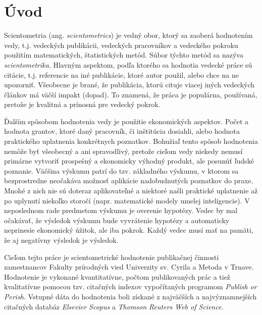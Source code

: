 \chapter*{Úvod}

Scientometria (ang. {\em scientometrics}) je vedný obor, ktorý sa zaoberá
hodnotením vedy, t.j. vedeckých publikácii, vedeckých pracovníkov a vedeckého
pokroku použitím matematických, štatistických metód.  Súbor týchto metód sa
nazýva {\em scientometrika}.  Hlavným aspektom, podľa ktorého sa hodnotia
vedecké práce sú citácie, t.j. referencie na iné publikácie, ktoré autor použil,
alebo chce na ne upozorniť.  Všeobecne je brané, že publikácia, ktorú cituje
viacej iných vedeckých článkov má väčší impakt (dopad).  To znamená, že práca je
populárna, používaná, pretože je kvalitná a prínosná pre vedecký pokrok.

Ďalším spôsobom hodnotenia vedy je použitie ekonomických aspektov.  Počet a
hodnota grantov, ktoré daný pracovník, či inštitúcia dosiahli, alebo hodnota
praktického uplatnenia konkrétnych poznatkov.  Bohužiaľ tento spôsob hodnotenia
nemôže byť všeobecný a ani spravodlivý, pretože cieľom vedy niekedy nemusí
primárne vytvoriť prospešný a ekonomicky výhodný produkt, ale posunúť ľudské
poznanie.  Väčšina výskumu patrí do tzv.  základného výskumu, v ktorom sa
bezprostredne neočakáva možnosť aplikácie nadobudnutých poznatkov do
praxe. Mnohé z nich nie sú doteraz aplikovateľné a niektoré našli praktické
uplatnenie až po uplynutí niekoľko storočí (napr. matematické modely umelej
inteligencie).  V neposlednom rade predmetom výskumu je overenie hypotézy.
Vedec by mal očakávať, že výsledok výskumu bude vyvrátenie hypotézy a
automaticky neprinesie ekonomický úžitok, ale iba pokrok.  Každý vedec musí mať
na pamäti, že aj negatívny výsledok je výsledok.

Cieľom tejto práce je scientometrické hodnotenie publikačnej činnosti
zamestnancov Fakulty prírodných vied Univerzity sv. Cyrila a Metoda v Trnave.
Hodnotenie je vykonané kvantitatívne, počtom publikovaných prác a tiež
kvalitatívne pomocou tzv. citačných indexov vypočítaných programom {\em Publish
  or Perish}.  Vstupné dáta do hodnotenia boli získané z najväčších a
najvýznamnejších citačných databáz {\em Elsevier Scopus} a {\em Thomson Reuters
  Web of Science}.

